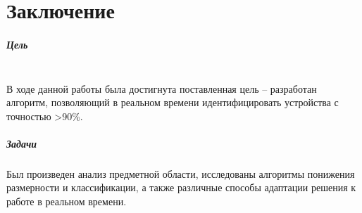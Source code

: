 \chapter{Заключение\\}
\label{chap:summary}
    \paragraph{Цель}
    \noindent\\
    В ходе данной работы была достигнута поставленная цель -- разработан алгоритм, позволяющий в реальном времени идентифицировать устройства с точностью >90\%.
    \paragraph{Задачи}
    \noindent
    
    \noindent
    Был произведен анализ предметной области, исследованы алгоритмы понижения размерности и классификации, а также различные способы адаптации решения к работе в реальном времени.
    

